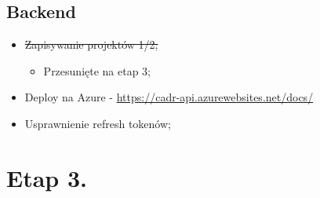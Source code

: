 \documentclass[11pt]{article}
\begin{document}
\subsection{Backend}
\label{sec:orgdbf8a0d}
\begin{itemize}
\item \sout{Zapisywanie projektów 1/2;}
\begin{itemize}
\item Przesunięte na etap 3;
\end{itemize}
\item Deploy na Azure -  \url{https://cadr-api.azurewebsites.net/docs/}
\item Usprawnienie refresh tokenów;
\end{itemize}
\section{Etap 3.}
\label{sec:org33dca55}
\end{document}
